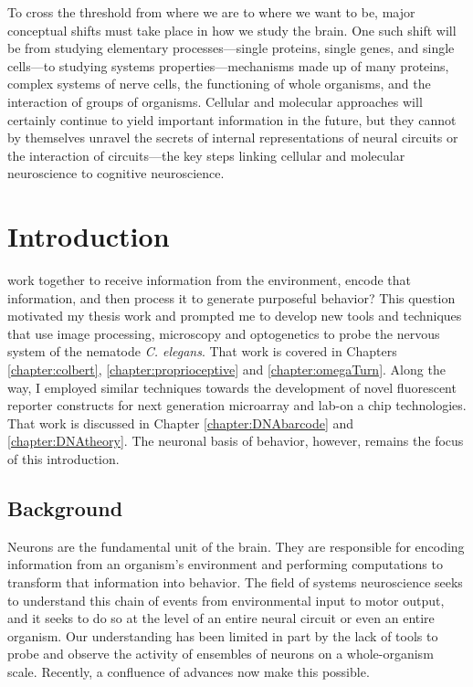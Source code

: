\begin{savequote}[75mm] 
To cross the threshold from where we are to where we want to be, major conceptual shifts must take place in how we study the brain. One such shift will be from studying elementary processes---single proteins, single genes, and single cells---to studying systems properties---mechanisms made up of many proteins, complex systems of nerve cells, the functioning of whole organisms, and the interaction of groups of organisms. Cellular and molecular approaches will certainly continue to yield important information in the future, but they cannot by themselves unravel the secrets of internal representations of neural circuits or the interaction of circuits---the key steps linking cellular and molecular neuroscience to cognitive neuroscience. 
\end{savequote}



\chapter{Introduction}

 work together to receive information from the environment, encode that information, and then process it to generate  purposeful behavior?  This question motivated my thesis work and prompted me to develop new tools and techniques that use image processing, microscopy and optogenetics to probe the nervous system of the nematode \emph{C. elegans}. That work is covered in Chapters \ref{chapter:colbert}, \ref{chapter:proprioceptive} and  \ref{chapter:omegaTurn}. Along the way, I employed similar techniques  towards the development of  novel fluorescent reporter constructs for next generation microarray and lab-on a chip technologies. That work is discussed in Chapter \ref{chapter:DNAbarcode} and \ref{chapter:DNAtheory}. The neuronal basis of behavior, however, remains the focus of this introduction.

\section{Background}
Neurons are the fundamental unit of the brain.  They are responsible for encoding information from an organism's environment and performing computations to transform that information into  behavior.  The field of systems neuroscience seeks to understand this chain of events from environmental input to motor output, and it seeks to do so at the level of an entire neural circuit or even an entire organism. Our understanding has been limited in part by the lack of tools to probe and observe the activity of ensembles of neurons on a whole-organism scale. Recently, a confluence of advances now make this possible.


